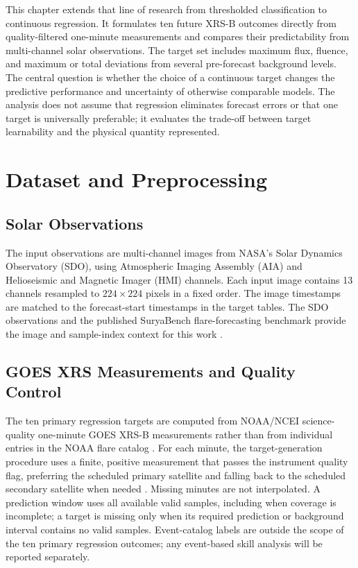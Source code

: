 \documentclass[12pt]{report}
\begin{document}
This chapter extends that line of research from thresholded classification to continuous regression. It formulates ten future XRS-B outcomes directly from quality-filtered one-minute measurements and compares their predictability from multi-channel solar observations. The target set includes maximum flux, fluence, and maximum or total deviations from several pre-forecast background levels. The central question is whether the choice of a continuous target changes the predictive performance and uncertainty of otherwise comparable models. The analysis does not assume that regression eliminates forecast errors or that one target is universally preferable; it evaluates the trade-off between target learnability and the physical quantity represented.

\section{Dataset and Preprocessing}

\subsection{Solar Observations}

The input observations are multi-channel images from NASA's Solar Dynamics Observatory (SDO), using Atmospheric Imaging Assembly (AIA) and Helioseismic and Magnetic Imager (HMI) channels. Each input image contains 13 channels resampled to $224\times224$ pixels in a fixed order. The image timestamps are matched to the forecast-start timestamps in the target tables. The SDO observations and the published SuryaBench flare-forecasting benchmark provide the image and sample-index context for this work \citep{roy2026suryabench}.

\subsection{GOES XRS Measurements and Quality Control}

The ten primary regression targets are computed from NOAA/NCEI science-quality one-minute GOES XRS-B measurements rather than from individual entries in the NOAA flare catalog \citep{machol2026goesrxs,machol2025xrsusersguide}. For each minute, the target-generation procedure uses a finite, positive measurement that passes the instrument quality flag, preferring the scheduled primary satellite and falling back to the scheduled secondary satellite when needed \citep{lucas2025goesflarereport}. Missing minutes are not interpolated. A prediction window uses all available valid samples, including when coverage is incomplete; a target is missing only when its required prediction or background interval contains no valid samples. Event-catalog labels are outside the scope of the ten primary regression outcomes; any event-based skill analysis will be reported separately.
\end{document}
